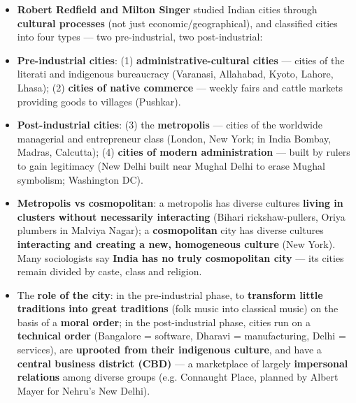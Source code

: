 \begin{KeyConcept}
\begin{itemize}
\item \textbf{Robert Redfield and Milton Singer} studied Indian cities through \textbf{cultural processes} (not just economic/geographical), and classified cities into four types --- two pre-industrial, two post-industrial:
\item \textbf{Pre-industrial cities}: (1) \textbf{administrative-cultural cities} --- cities of the literati and indigenous bureaucracy (Varanasi, Allahabad, Kyoto, Lahore, Lhasa); (2) \textbf{cities of native commerce} --- weekly fairs and cattle markets providing goods to villages (Pushkar).
\item \textbf{Post-industrial cities}: (3) the \textbf{metropolis} --- cities of the worldwide managerial and entrepreneur class (London, New York; in India Bombay, Madras, Calcutta); (4) \textbf{cities of modern administration} --- built by rulers to gain legitimacy (New Delhi built near Mughal Delhi to erase Mughal symbolism; Washington DC).
\item \textbf{Metropolis vs cosmopolitan}: a metropolis has diverse cultures \textbf{living in clusters without necessarily interacting} (Bihari rickshaw-pullers, Oriya plumbers in Malviya Nagar); a \textbf{cosmopolitan} city has diverse cultures \textbf{interacting and creating a new, homogeneous culture} (New York). Many sociologists say \textbf{India has no truly cosmopolitan city} --- its cities remain divided by caste, class and religion.
\item The \textbf{role of the city}: in the pre-industrial phase, to \textbf{transform little traditions into great traditions} (folk music into classical music) on the basis of a \textbf{moral order}; in the post-industrial phase, cities run on a \textbf{technical order} (Bangalore = software, Dharavi = manufacturing, Delhi = services), are \textbf{uprooted from their indigenous culture}, and have a \textbf{central business district (CBD)} --- a marketplace of largely \textbf{impersonal relations} among diverse groups (e.g. Connaught Place, planned by Albert Mayer for Nehru's New Delhi).
\end{itemize}
\end{KeyConcept}

